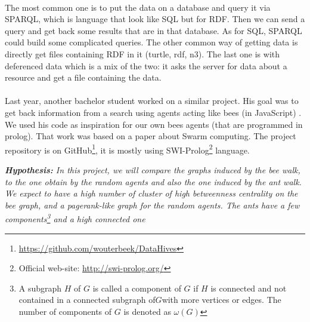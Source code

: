 \documentclass{article}
\begin{document}
	\paragraph{} %
	The most common one is to put the data on a database and query it via SPARQL,
	which is language that look like SQL but for RDF.
	Then we can send a query and get back some results that are in that database.
	As for SQL, SPARQL could build some complicated queries.
	The other common way of getting data is directly get files containing RDF in it (turtle, rdf, n3).
	The last one is with deferenced data which is a mix of the two:
	it asks the server for data about a resource and get a file containing the data.
	\paragraph{} %
	Last year, another bachelor student worked on a similar project.
	His goal was to get back information from a search using agents acting like bees (in JavaScript) \cite{Kroes13,Kroes13-2}.
	We used his code as inspiration for our own bees agents (that are programmed in prolog).
	That work was based on a paper \cite{Gueret10} about Swarm computing.
	The project repository is on GitHub\footnote{ \url{https://github.com/wouterbeek/DataHives}},
	it is mostly using SWI-Prolog\footnote{ Official web-site: \url{http://swi-prolog.org/}} language.
	\begin{center}
	\textit{
	\textbf{Hypothesis:} In this project, we will compare the graphs induced by the bee walk,
	to the one obtain by the random agents and also the one induced by the ant walk.
	We expect to have a high number of cluster of high betweenness centrality on the bee graph,
	and a pagerank-like graph for the random agents.
	The ants have a few components\footnote{
	A subgraph $H$ of $G$ is called a component of $G$ if $H$ is connected
	and not contained in a connected subgraph of$G$with more vertices or edges.
	The number of components of $G$ is denoted as $\omega(G)$}
	and a high connected one}
	\end{center}

\end{document}

